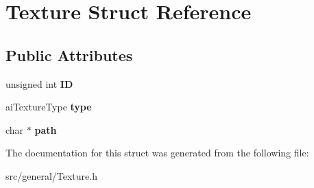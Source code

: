 \hypertarget{struct_texture}{}\section{Texture Struct Reference}
\label{struct_texture}
\subsection*{Public Attributes}
\begin{DoxyCompactItemize}
\item 
\mbox{\label{struct_texture_a2f10b3a99a9f33294b5d94fd31a04ba6}} 
unsigned int {\bfseries ID}
\item 
\mbox{\label{struct_texture_af3f84482beef76b5e95579ca6891f544}} 
ai\+Texture\+Type {\bfseries type}
\item 
\mbox{\label{struct_texture_ad3b2ec7275b41d16a81146d72a735031}} 
char $\ast$ {\bfseries path}
\end{DoxyCompactItemize}


The documentation for this struct was generated from the following file\+:\begin{DoxyCompactItemize}
\item 
src/general/Texture.\+h\end{DoxyCompactItemize}
